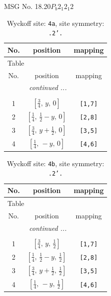 \documentclass[fleqn,8pt]{jsarticle}
\begin{document}
\setcounter{MaxMatrixCols}{32}

\renewcommand{\tablename}{Table~}
\renewcommand{\figurename}{Figure~}
\begin{center}
\LARGE
MSG No. 18.20\quad$P_{b}2_{1}2_{1}2$
\end{center}
\renewcommand{\arraystretch}{1.2}
\begin{longtable}{ccc}
\caption{Wyckoff site: {\tt 4a}, site symmetry: {\tt .2'.}}
 \\
 \hline \hline
No. & position & mapping \\ \hline \endfirsthead

\multicolumn{2}{l}{\tablename\ \thetable{}} \\
 \hline \hline
No. & position & mapping \\ \hline \endhead

 \hline \hline
\multicolumn{2}{r}{\footnotesize\it continued ...} \\ \endfoot

 \hline \hline
\multicolumn{2}{r}{} \\ \endlastfoot

1 & $\left[ \frac{3}{4},\, y,\, 0 \right]$ & {\tt [1,7]} \\ \hline
2 & $\left[ \frac{1}{4},\, \frac{1}{2} - y,\, 0 \right]$ & {\tt [2,8]} \\ \hline
3 & $\left[ \frac{3}{4},\, y + \frac{1}{2},\, 0 \right]$ & {\tt [3,5]} \\ \hline
4 & $\left[ \frac{1}{4},\, - y,\, 0 \right]$ & {\tt [4,6]} \\
\end{longtable}
\renewcommand{\arraystretch}{1.2}
\begin{longtable}{ccc}
\caption{Wyckoff site: {\tt 4b}, site symmetry: {\tt .2'.}}
 \\
 \hline \hline
No. & position & mapping \\ \hline \endfirsthead

\multicolumn{2}{l}{\tablename\ \thetable{}} \\
 \hline \hline
No. & position & mapping \\ \hline \endhead

 \hline \hline
\multicolumn{2}{r}{\footnotesize\it continued ...} \\ \endfoot

 \hline \hline
\multicolumn{2}{r}{} \\ \endlastfoot

1 & $\left[ \frac{3}{4},\, y,\, \frac{1}{2} \right]$ & {\tt [1,7]} \\ \hline
2 & $\left[ \frac{1}{4},\, \frac{1}{2} - y,\, \frac{1}{2} \right]$ & {\tt [2,8]} \\ \hline
3 & $\left[ \frac{3}{4},\, y + \frac{1}{2},\, \frac{1}{2} \right]$ & {\tt [3,5]} \\ \hline
4 & $\left[ \frac{1}{4},\, - y,\, \frac{1}{2} \right]$ & {\tt [4,6]} \\
\end{longtable}
\end{document}
